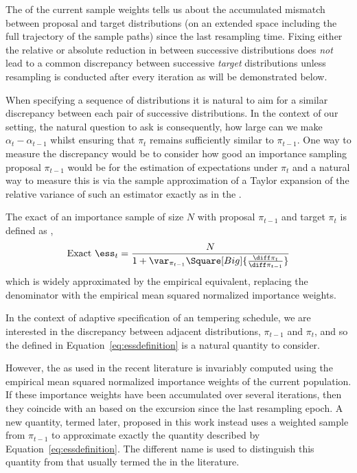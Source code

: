 The \ess of the current sample weights tells us about the accumulated mismatch between proposal and target distributions (on an extended space including the full trajectory of the sample paths) since the last resampling time. Fixing either the relative or absolute reduction in \ess between successive distributions does \emph{not} lead to a common discrepancy between successive \emph{target} distributions unless resampling is conducted after every iteration as will be demonstrated below.

When specifying a sequence of distributions it is natural to aim for a similar discrepancy between each pair of successive distributions. In the context of our setting, the natural question to ask is consequently, how large can we make $\alpha_t - \alpha_{t-1}$ whilst ensuring that $\pi_{t}$ remains sufficiently similar to $\pi_{t-1}$. One way to measure the discrepancy would be to consider how good an importance sampling proposal $\pi_{t-1}$ would be for the estimation of expectations under $\pi_t$ and a natural way to measure this is via the sample approximation of a Taylor expansion of the relative variance of such an estimator exactly as in the \ess.

The exact \ess of an importance sample of size $N$ with proposal $\pi_{t-1}$ and target $\pi_t$ is defined as \cite{Kong:1994ul},
\begin{equation}
  \text{Exact }\ess_t =
  \frac{N}{1 + \var_{\pi_{t-1}}\Square[Big]{\frac{\diff\pi_t}{\diff\pi_{t-1}}}}
  \label{eq:essdefinition}
\end{equation}
which is widely approximated by the empirical equivalent, replacing the denominator with the empirical mean squared normalized importance weights.

In the context of adaptive specification of an \smc tempering schedule, we are interested in the discrepancy between adjacent distributions, $\pi_{t-1}$ and $\pi_t$, and so the \ess defined in Equation~\eqref{eq:essdefinition} is a natural quantity to consider.

However, the \ess as used in the recent \smc literature is invariably computed using the empirical mean squared normalized importance weights of the current population. If these importance weights have been accumulated over several iterations, then they coincide with an \ess based on the excursion since the last resampling epoch. A new quantity, termed \emph{\cess} later, proposed in this work instead uses a weighted sample from $\pi_{t-1}$ to approximate exactly the quantity described by Equation~\eqref{eq:essdefinition}. The different name is used to distinguish this quantity from that usually termed the \ess in the \smc literature.

